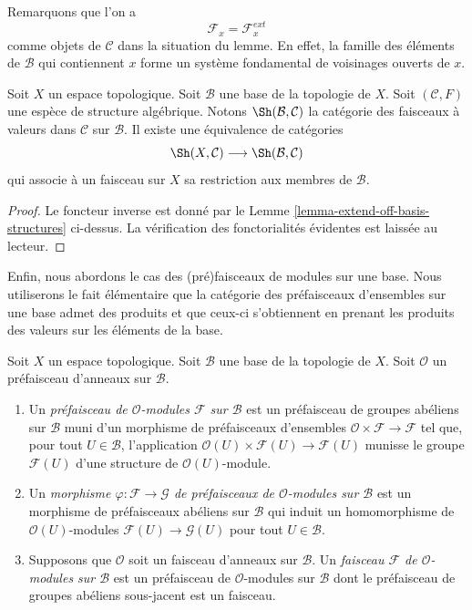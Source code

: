 \noindent
Remarquons que l'on a
$$
\mathcal{F}_x = \mathcal{F}_x^{ext}
$$
comme objets de $\mathcal{C}$
dans la situation du lemme. En effet, la
famille des éléments de $\mathcal{B}$ qui contiennent
$x$ forme un système fondamental de voisinages ouverts de $x$.

\begin{lemma}
\label{lemma-restrict-basis-equivalence-structures}
Soit $X$ un espace topologique.
Soit $\mathcal{B}$ une base de la topologie de $X$.
Soit $(\mathcal{C}, F)$ une espèce de structure algébrique.
Notons $\Sh(\mathcal{B}, \mathcal{C})$ la catégorie des
faisceaux à valeurs dans $\mathcal{C}$ sur $\mathcal{B}$.
Il existe une équivalence de catégories
$$
\Sh(X, \mathcal{C})
\longrightarrow
\Sh(\mathcal{B}, \mathcal{C})
$$
qui associe à un faisceau sur $X$ sa restriction aux
membres de $\mathcal{B}$.
\end{lemma}

\begin{proof}
Le foncteur inverse est donné par le
Lemme \ref{lemma-extend-off-basis-structures} ci-dessus.
La vérification des fonctorialités évidentes est laissée au
lecteur.
\end{proof}

\noindent
Enfin, nous abordons le cas des (pré)faisceaux de modules
sur une base. Nous utiliserons le fait élémentaire que la catégorie
des préfaisceaux d'ensembles sur une base admet des produits et que
ceux-ci s'obtiennent en prenant les produits des valeurs sur les
éléments de la base.

\begin{definition}
\label{definition-sheaf-modules-basis}
Soit $X$ un espace topologique. Soit $\mathcal{B}$ une
base de la topologie de $X$. Soit $\mathcal{O}$
un préfaisceau d'anneaux sur $\mathcal{B}$.
\begin{enumerate}
\item Un {\it préfaisceau de $\mathcal{O}$-modules $\mathcal{F}$
sur $\mathcal{B}$} est un préfaisceau de groupes abéliens sur
$\mathcal{B}$ muni d'un morphisme de préfaisceaux
d'ensembles $\mathcal{O} \times \mathcal{F} \to \mathcal{F}$
tel que, pour tout $U \in \mathcal{B}$, l'application
$\mathcal{O}(U) \times \mathcal{F}(U) \to \mathcal{F}(U)$
munisse le groupe $\mathcal{F}(U)$ d'une structure de $\mathcal{O}(U)$-module.
\item Un {\it morphisme $\varphi : \mathcal{F} \to \mathcal{G}$
de préfaisceaux de $\mathcal{O}$-modules sur $\mathcal{B}$}
est un morphisme de préfaisceaux abéliens sur $\mathcal{B}$
qui induit un homomorphisme de $\mathcal{O}(U)$-modules
$\mathcal{F}(U) \to \mathcal{G}(U)$ pour tout $U \in \mathcal{B}$.
\item Supposons que $\mathcal{O}$ soit un faisceau d'anneaux
sur $\mathcal{B}$. Un {\it faisceau $\mathcal{F}$ de $\mathcal{O}$-modules
sur $\mathcal{B}$} est un préfaisceau de $\mathcal{O}$-modules
sur $\mathcal{B}$ dont le préfaisceau de groupes abéliens sous-jacent
est un faisceau.
\end{enumerate}
\end{definition}

